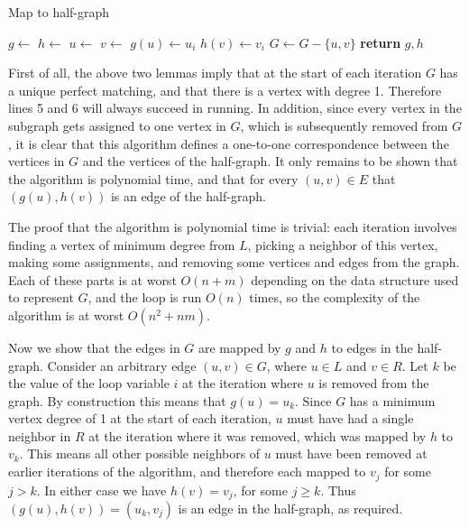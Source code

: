 \documentclass{hmcpset}
\begin{document}
\begin{solution}
\begin{enumerate}[label=(\Alph*)]
\begin{algorithm}
  \caption{Map to half-graph}
  \begin{algorithmic}[1]
    \State $g\gets$ 
    \State $h\gets$ 
      \State $u\gets$ 
      \State $v\gets$ 
      \State $g(u)\gets u_i$
      \State $h(v)\gets v_i$
      \State $G\gets G - \{u, v\}$
    \EndFor
    \State \textbf{return} $g, h$
    \EndProcedure
  \end{algorithmic}
\end{algorithm}

First of all, the above two lemmas imply that at the start of each iteration
$G$ has a unique perfect matching, and that there is a vertex with degree 1.
Therefore lines 5 and 6 will always succeed in running.
In addition, since every vertex in the subgraph gets assigned to one vertex in $G$,
which is subsequently removed from $G$,
it is clear that this algorithm defines a one-to-one correspondence
between the vertices in $G$ and the vertices of the half-graph.
It only remains to be shown that the algorithm is polynomial time, and that
for every $(u, v) \in E$ that $(g(u), h(v))$ is an edge of the half-graph.

The proof that the algorithm is polynomial time is trivial: each iteration
involves finding a vertex of minimum degree from $L$, picking a neighbor
of this vertex, making some assignments, and removing some vertices and
edges from the graph. Each of these parts is at worst $O(n + m)$ depending on
the data structure used to represent $G$, and the loop is run $O(n)$ times,
so the complexity of the algorithm is at worst $O(n^2 + nm)$.

Now we show that the edges in $G$ are mapped by $g$ and $h$ to edges
in the half-graph. Consider an arbitrary edge
$(u, v) \in G$, where $u \in L$ and
$v \in R$. Let $k$ be the value of the loop variable $i$ at the iteration
where $u$ is removed from the graph. By construction this means that
$g(u) = u_k$.
Since $G$ has a minimum vertex degree of 1 at the start of each iteration,
$u$ must have had a single neighbor in $R$ at the iteration where it was
removed, which was mapped by $h$ to $v_k$.
This means all other possible neighbors of $u$ must have
been removed at earlier iterations of the algorithm, and therefore each
mapped to $v_j$ for some $j > k$. In either case we have $h(v) = v_j$,
for some $j \ge k$. Thus $(g(u), h(v)) = (u_k, v_j)$ is an edge
in the half-graph, as required.

\end{enumerate}
\end{solution}
\end{document}
